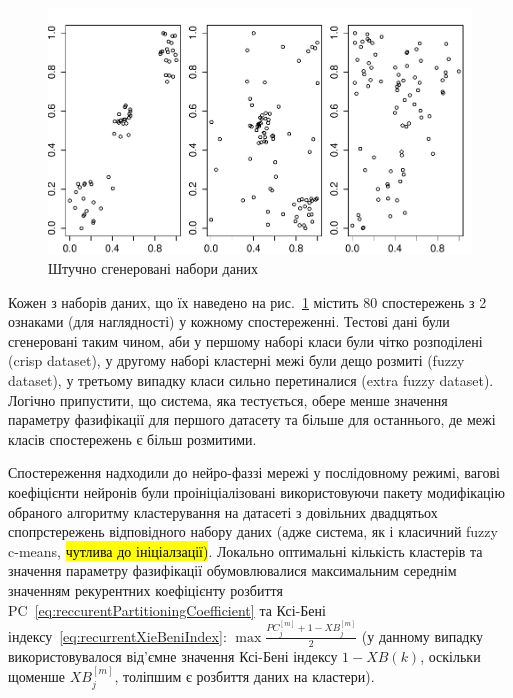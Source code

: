\documentclass{vakthesis}
\begin{document}
\begin{figure}
\begin{center}
\includegraphics{clustering01.pdf}
\caption{Штучно сгенеровані набори даних}
\label{fig:clustering01}
\end{center}
\end{figure}

Кожен з наборів даних, що їх наведено на рис.~\ref{fig:clustering01} містить 80 спостережень з 2 ознаками (для наглядності) у кожному спостереженні. Тестові дані були сгенеровані таким чином, аби у першому наборі класи були чітко розподілені (crisp dataset), у другому наборі кластерні межі були дещо розмиті (fuzzy dataset), у третьому випадку класи сильно перетиналися (extra fuzzy dataset). Логічно припустити, що система, яка тестується, обере менше значення параметру фазифікації для першого датасету та більше для останнього, де межі класів спостережень є більш розмитими.

Спостереження надходили до нейро-фаззі мережі у послідовному режимі, вагові коефіцієнти нейронів були проініціалізовані використовуючи пакету модифікацію обраного алгоритму кластерування на датасеті з довільних двадцятьох спопрстережень відповідного набору даних (адже система, як і класичний fuzzy c-means, \hl{чутлива до ініціалзації)}. Локально оптимальні кількість кластерів та значення параметру фазифікації обумовлювалися максимальним середнім значенням рекурентних коефіцієнту розбиття PC \eqref{eq:reccurentPartitioningCoefficient} та Ксі-Бені індексу \eqref{eq:recurrentXieBeniIndex}: $\max{\frac{PC_j^{[m]} + 1 - XB_j^{[m]}}{2}}$ (у данному випадку використовувалося від'ємне значення Ксі-Бені індексу $1-XB\left(k\right)$, оскільки щоменше $XB_j^{[m]}$, толіпшим є розбиття даних на кластери). 
\end{document}

